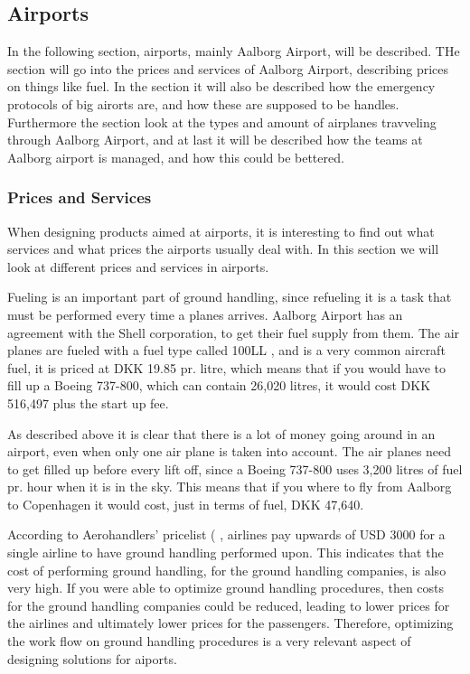 \subsection{Airports}

In the following section, airports, mainly Aalborg Airport, will be described. THe section will go into the prices and services of Aalborg Airport, describing prices on things like fuel. In the section it will also be described how the emergency protocols of big airorts are, and how these are supposed to be handles. Furthermore the section look at the types and amount of airplanes travveling through Aalborg Airport, and at last it will be described how the teams at Aalborg airport is managed, and how this could be bettered.

\subsubsection{Prices and Services}
When designing products aimed at airports, it is interesting to find out what services and what prices the airports usually deal with. In this section we will look at different prices and services in airports.


Fueling is an important part of ground handling, since refueling it is a task that must be performed every time a planes arrives. Aalborg Airport has an agreement with the Shell corporation, to get their fuel supply from them. The air planes are fueled with a fuel type called 100LL \cite{iaopa_fuelprices}, and is a very common aircraft fuel, it is priced at DKK 19.85 pr. litre, which means that if you would have to fill up a Boeing 737-800, which can contain 26,020 litres\cite{737_specs}, it would cost DKK 516,497 plus the start up fee.

As described above it is clear that there is a lot of money going around in an airport, even when only one air plane is taken into account. The air planes need to get filled up before every lift off, since a Boeing 737-800 uses 3,200 litres of fuel pr. hour when it is in the sky. This means that if you where to fly from Aalborg to Copenhagen it would cost, just in terms of fuel, DKK 47,640.


According to Aerohandlers' pricelist (%
, airlines pay upwards of USD 3000 for a single airline to have ground handling performed upon. This indicates that the cost of performing ground handling, for the ground handling companies, is also very high. If you were able to optimize ground handling procedures, then costs for the ground handling companies could be reduced, leading to lower prices for the airlines and ultimately lower prices for the passengers. Therefore, optimizing the work flow on ground handling procedures is a very relevant aspect of designing solutions for aiports.